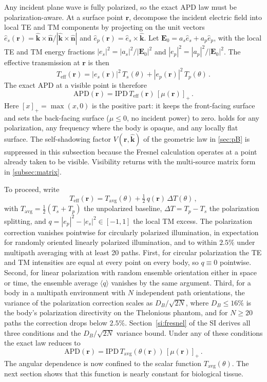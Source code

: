 \documentclass[journal,twocolumn,10pt]{IEEEtran}
\newcommand{\khat}{\hat{\bm{k}}}
\newcommand{\nhat}{\hat{\bm{n}}}
\newcommand{\rr}{\mathbf{r}}
\newcommand{\EE}{\mathbf{E}}
\newcommand{\IPD}{\mathrm{IPD}}
\newcommand{\APD}{\mathrm{APD}}
\newcommand{\Teff}{T_{\mathrm{eff}}}
\newcommand{\Tavg}{T_{\mathrm{avg}}}
\newcommand{\pospart}[1]{\left[#1\right]_{+}}
\newcommand{\Vis}{V}
\begin{document}
Any incident plane wave is fully polarized, so the exact \gls{APD}
law must be polarization-aware. At a surface point
$\rr$, decompose the incident electric field into local TE and TM
components by projecting on the unit vectors
$\hat{e}_s(\rr) = \khat \times \nhat / |\khat \times \nhat|$ and
$\hat{e}_p(\rr) = \hat{e}_s \times \khat$. Let $\EE_0 = a_s \hat{e}_s + a_p \hat{e}_p$, with the local TE and TM
energy fractions $|e_s|^2 = |a_s|^2 / |\EE_0|^2$ and
$|e_p|^2 = |a_p|^2 / |\EE_0|^2$. The effective transmission at $\rr$
is then
\begin{equation}\label{eq:Teff}
  \Teff(\rr) = |e_s(\rr)|^2 \, T_s(\theta) + |e_p(\rr)|^2 \,
  T_p(\theta)\, .
\end{equation}
The exact \gls{APD} at a visible point is therefore
\begin{equation}\label{eq:Sab-exact}
  \APD(\rr) = \IPD \, \Teff(\rr) \, \pospart{\mu(\rr)} \,.
\end{equation}
Here $\pospart{x} = \max(x, 0)$ is the positive part: it keeps the
front-facing surface and sets the back-facing surface ($\mu \le 0$, no
incident power) to zero.
 holds for any polarization, any frequency where
the body is opaque, and any locally flat surface. The self-shadowing
factor $\Vis(\rr,\khat)$ of the geometric law in \cref{sec:pB} is
suppressed in this subsection because the Fresnel calculation
operates at a point already taken to be visible. Visibility returns
with the multi-source matrix form in \cref{subsec:matrix}.

To proceed, write
\begin{equation}\label{eq:Teff-decomp}
  \Teff(\rr) = \Tavg(\theta) + \tfrac{1}{2}\,q(\rr)\,\Delta T(\theta)\, ,
\end{equation}
with $\Tavg = \tfrac{1}{2}(T_s + T_p)$ the unpolarized baseline,
$\Delta T = T_p - T_s$ the polarization splitting, and $q = |e_p|^2 -
|e_s|^2 \in [-1, 1]$ the local TM excess. The polarization correction
vanishes pointwise for circularly polarized illumination, in expectation
for randomly oriented linearly polarized illumination, and to within
$2.5\%$ under multipath averaging with at least 20 paths. First, for circular polarization
the TE and TM intensities are equal at every point on every body, so
$q \equiv 0$ pointwise. Second, for linear polarization with random
ensemble orientation either in space or time, the ensemble average
$\langle q\rangle$ vanishes by the same argument. Third, for a body
in a multipath environment with $N$ independent path orientations,
the variance of the polarization correction scales as $D_B/\sqrt{2N}$,
where $D_B \le 16\%$ is the body's polarization directivity on the
Thelonious phantom, and for $N \ge 20$ paths the correction drops
below $2.5\%$. Section~\ref{si:fresnel} of the SI derives all three
conditions and the $D_B/\sqrt{2N}$ variance bound. Under any of these conditions the exact law reduces to
\begin{equation}\label{eq:Sab-Tavg}
  \APD(\rr) = \IPD \, \Tavg(\theta(\rr)) \, \pospart{\mu(\rr)}\, .
\end{equation}
The angular dependence is now confined to the scalar function
$\Tavg(\theta)$. The next section shows that this function is nearly
constant for biological tissue.
\end{document}
